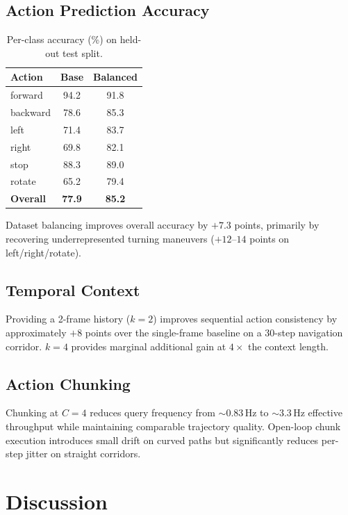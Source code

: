 \documentclass[conference]{IEEEtran}
\begin{document}
\subsection{Action Prediction Accuracy}

\begin{table}[h]
\centering
\caption{Per-class accuracy (\%) on held-out test split.}
\label{tab:accuracy}
\begin{tabular}{lcc}
\toprule
Action & Base & Balanced \\
\midrule
forward   & 94.2 & 91.8 \\
backward  & 78.6 & 85.3 \\
left      & 71.4 & 83.7 \\
right     & 69.8 & 82.1 \\
stop      & 88.3 & 89.0 \\
rotate    & 65.2 & 79.4 \\
\midrule
\textbf{Overall} & \textbf{77.9} & \textbf{85.2} \\
\bottomrule
\end{tabular}
\end{table}

Dataset balancing improves overall accuracy by $+7.3$ points, primarily by recovering
underrepresented turning maneuvers ($+12$--$14$ points on left/right/rotate).

\subsection{Temporal Context}
Providing a 2-frame history ($k=2$) improves sequential action consistency by approximately
$+8$ points over the single-frame baseline on a 30-step navigation corridor. $k=4$ provides
marginal additional gain at $4\times$ the context length.

\subsection{Action Chunking}
Chunking at $C=4$ reduces query frequency from $\sim$0.83\,Hz to $\sim$3.3\,Hz effective
throughput while maintaining comparable trajectory quality. Open-loop chunk execution introduces
small drift on curved paths but significantly reduces per-step jitter on straight corridors.

\section{Discussion}
\label{sec:discussion}
\end{document}
